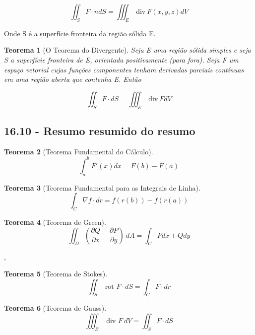 \documentclass[12pt]{article}
\newtheorem{theorem}{Teorema}[section]
\begin{document}
$$\iint_S F \cdot n d S = \iiint_E \ \text{div} \ F(x, y, z) d V$$

Onde S é a superfície fronteira da região sólida E.

\begin{theorem}[O Teorema do Divergente]
    Seja E uma região sólida simples e seja S a superfície fronteira de E, orientada positivamente (para fora). Seja F um espaço vetorial cujas funções componentes tenham derivadas parciais contínuas em uma região aberta que contenha E. Então
    
    $$\iint_S F \cdot d S = \iiint_E \ \text{div} \ F d V$$
\end{theorem}

\subsection*{16.10 - Resumo resumido do resumo}

\begin{theorem}[Teorema Fundamental do Cálculo]
    $$\int_a^b F'(x) d x = F(b) - F(a)$$
\end{theorem}

\begin{theorem}[Teorema Fundamental para as Integrais de Linha]
    $$\int_C \nabla f \cdot d r = f(r(b)) - f(r(a))$$
\end{theorem}

\begin{theorem}[Teorema de Green]
    $$\iint_D \left( \dfrac{\partial Q}{\partial x} - \dfrac{\partial P}{\partial y} \right) \ d A = \int_C P d x + Q d y$$
\end{theorem},

\begin{theorem}[Teorema de Stokes]
    $$\iint_S \text{ rot } F \cdot d S = \int_C F \cdot d r$$
\end{theorem}

\begin{theorem}[Teorema de Gauss]
    $$\iiint_E \text{ div } F \ d V = \iint_S F \cdot d S$$
\end{theorem}
\end{document}

